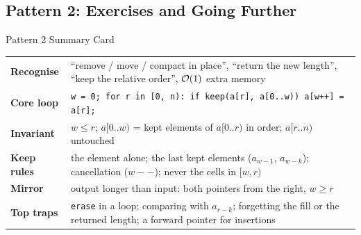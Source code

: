 \subsection{Pattern 2: Exercises and Going Further}
\label{ssec:ch1-p2-ex}

\begin{patternbox}{Pattern 2 Summary Card}
\begin{tabularx}{\linewidth}{@{}>{\bfseries}l X@{}}
Recognise & ``remove / move / compact in place'', ``return the new length'', ``keep the relative order'', $\mathcal{O}(1)$ extra memory \\
Core loop & \texttt{w = 0; for r in [0, n): if keep(a[r], a[0..w)) a[w++] = a[r];} \\
Invariant & $w \le r$; $a[0..w)$ = kept elements of $a[0..r)$ in order; $a[r..n)$ untouched \\
Keep rules & the element alone; the last kept elements ($a_{w-1}$, $a_{w-k}$); cancellation ($w{-}{-}$); never the cells in $[w, r)$ \\
Mirror & output longer than input: both pointers from the right, $w \ge r$ \\
Top traps & \texttt{erase} in a loop; comparing with $a_{r-k}$; forgetting the fill or the returned length; a forward pointer for insertions \\
\end{tabularx}
\end{patternbox}

